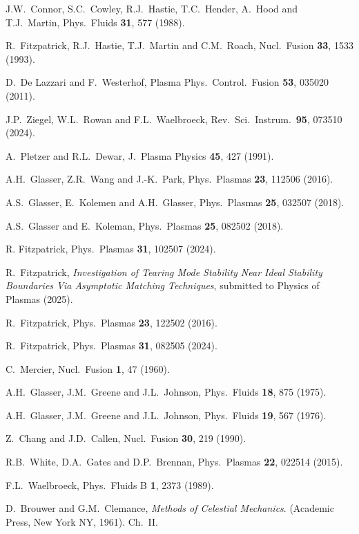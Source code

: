 \documentclass[12pt,prb,aps]{revtex4-1}
\begin{document}
\begin{thebibliography}{99}
 J.W.~Connor,  S.C.~Cowley, R.J.~Hastie,  T.C.~Hender,  A.~Hood  and T.J.~Martin,  Phys.\ Fluids {\bf 31}, 577 (1988).

 R.~Fitzpatrick, R.J.~Hastie, T.J.~Martin and C.M.~Roach, Nucl.\ Fusion {\bf 33}, 1533 (1993).

 D.~De Lazzari and F.~Westerhof, Plasma Phys.\ Control.\ Fusion {\bf 53}, 035020 (2011).

 J.P.~Ziegel, W.L.~Rowan and F.L.~Waelbroeck, Rev.\ Sci.\ Instrum.\ {\bf 95}, 073510 (2024).

 A.~Pletzer and R.L.~Dewar, J.\ Plasma Physics {\bf 45}, 427 (1991).

 A.H.~Glasser, Z.R.~Wang and J.-K.~Park, Phys.\ Plasmas {\bf 23}, 112506 (2016).

 A.S.~Glasser, E.~Kolemen and A.H.~Glasser, Phys.\ Plasmas {\bf 25}, 032507 (2018).

 A.S.~Glasser and E.~Koleman, Phys.\ Plasmas {\bf 25}, 082502 (2018). 

 R. Fitzpatrick, Phys.\ Plasmas {\bf 31}, 102507 (2024).

 R.~Fitzpatrick,  {\em Investigation of  Tearing Mode Stability Near Ideal Stability Boundaries Via Asymptotic Matching Techniques}, submitted
to Physics of Plasmas (2025).

 R.~Fitzpatrick, Phys.\ Plasmas {\bf 23}, 122502 (2016).

 R.~Fitzpatrick, Phys.\ Plasmas {\bf 31}, 082505 (2024).

 C.~Mercier, Nucl.\ Fusion {\bf 1}, 47 (1960).

 A.H.~Glasser, J.M.~Greene and J.L.~Johnson, Phys.\ Fluids {\bf 18}, 875 (1975).

 A.H.~Glasser, J.M.~Greene  and J.L.~Johnson, Phys.\ Fluids {\bf 19}, 567 (1976).

 Z.~Chang and J.D.~Callen,  Nucl.\ Fusion {\bf 30}, 219 (1990).

 R.B.~White, D.A.~Gates and D.P.~Brennan, Phys.\ Plasmas {\bf 22}, 022514 (2015). 

 F.L.~Waelbroeck, Phys.\ Fluids B {\bf 1}, 2373 (1989).

 D.~Brouwer and G.M.~Clemance, {\em Methods of Celestial Mechanics}. (Academic Press, New York NY, 1961).  Ch.~II.


\end{thebibliography}
\end{document}
